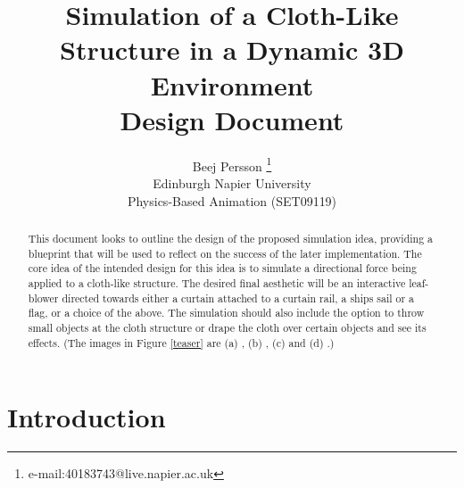 \documentclass[conference,backref=page]{acmsiggraph}
\title{Simulation of a Cloth-Like Structure in a Dynamic 3D Environment\\
	Design Document}
\author{Beej Persson \thanks{e-mail:40183743@live.napier.ac.uk} \\
	Edinburgh Napier University\\
	Physics-Based Animation (SET09119)}
\begin{document}
	
	
	\maketitle
	
	\raggedbottom
	
	\begin{abstract}
		
		This document looks to outline the design of the proposed simulation idea, providing a blueprint that will be used to reflect on the success of the later implementation. The core idea of the intended design for this idea is to simulate a directional force being applied to a cloth-like structure. The desired final aesthetic will be an interactive leaf-blower directed towards either a curtain attached to a curtain rail, a ships sail or a flag, or a choice of the above. The simulation should also include the option to throw small objects at the cloth structure or drape the cloth over certain objects and see its effects. (The images in Figure \ref{teaser} are (a) \cite{sail}, (b) \cite{clothmesh}, (c) \cite{flag} and (d) \cite{object}.)
		
	\end{abstract}
	
	
	
	\keywordlist
	
	
	
	
	
	\section{Introduction}
	
	
	
\end{document}
